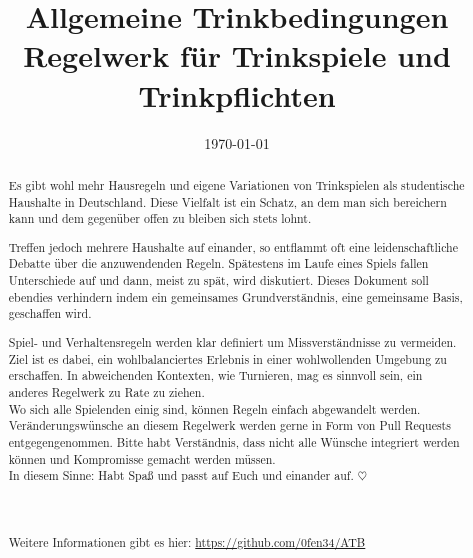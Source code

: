 \documentclass{report}
\title{\Huge Allgemeine Trinkbedingungen \\[2ex] \Large Regelwerk für Trinkspiele und Trinkpflichten}
\author{}
\date{\today}
\begin{document}


\maketitle
\begin{abstract}

	Es gibt wohl mehr Hausregeln und eigene Variationen von Trinkspielen als studentische Haushalte in Deutschland.
	Diese Vielfalt ist ein Schatz, an dem man sich bereichern kann und dem gegenüber offen zu bleiben sich stets lohnt.
	
	Treffen jedoch mehrere Haushalte auf einander, so entflammt oft eine leidenschaftliche Debatte über die anzuwendenden Regeln.
	Spätestens im Laufe eines Spiels fallen Unterschiede auf und dann, meist zu spät, wird diskutiert.
	Dieses Dokument soll ebendies verhindern indem ein gemeinsames Grundverständnis, eine gemeinsame Basis, geschaffen wird.

	Spiel- und Verhaltensregeln werden klar definiert um Missverständnisse zu vermeiden.
	Ziel ist es dabei, ein wohlbalanciertes Erlebnis in einer wohlwollenden Umgebung zu erschaffen.
	In abweichenden Kontexten, wie Turnieren, mag es sinnvoll sein, ein anderes Regelwerk zu Rate zu ziehen.
	\\

	Wo sich alle Spielenden einig sind, können Regeln einfach abgewandelt werden.
	Veränderungswünsche an diesem Regelwerk werden gerne in Form von Pull Requests entgegengenommen.
	Bitte habt Verständnis, dass nicht alle Wünsche integriert werden können und Kompromisse gemacht werden müssen.
	\\

	In diesem Sinne: Habt Spaß und passt auf Euch und einander auf.
	\begin{math}
		\heartsuit
	\end{math}
	\\
	\\
	\\
	\\
	Weitere Informationen gibt es hier:
	\url{https://github.com/0fen34/ATB}
\end{abstract}
\tableofcontents
\cleardoublepage{}











\end{document}
